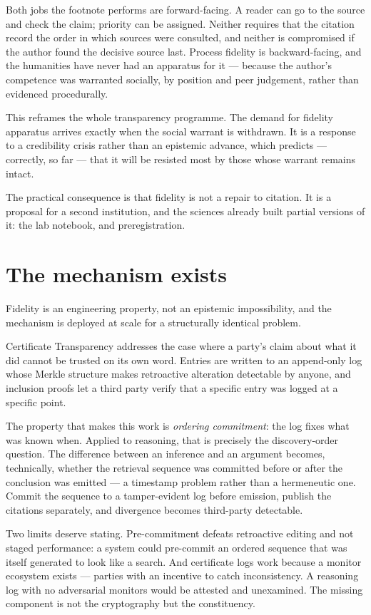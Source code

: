 \documentclass[11pt,a4paper]{article}
\begin{document}
Both jobs the footnote performs are forward-facing. A reader can go to the source and check the claim; priority can be assigned. Neither requires that the citation record the order in which sources were consulted, and neither is compromised if the author found the decisive source last. Process fidelity is backward-facing, and the humanities have never had an apparatus for it --- because the author's competence was warranted socially, by position and peer judgement, rather than evidenced procedurally.

This reframes the whole transparency programme. The demand for fidelity apparatus arrives exactly when the social warrant is withdrawn. It is a response to a credibility crisis rather than an epistemic advance, which predicts --- correctly, so far --- that it will be resisted most by those whose warrant remains intact.

The practical consequence is that fidelity is not a repair to citation. It is a proposal for a second institution, and the sciences already built partial versions of it: the lab notebook, and preregistration.

\section{The mechanism exists}
Fidelity is an engineering property, not an epistemic impossibility, and the mechanism is deployed at scale for a structurally identical problem.

Certificate Transparency addresses the case where a party's claim about what it did cannot be trusted on its own word. Entries are written to an append-only log whose Merkle structure makes retroactive alteration detectable by anyone, and inclusion proofs let a third party verify that a specific entry was logged at a specific point.

The property that makes this work is \emph{ordering commitment}: the log fixes what was known when. Applied to reasoning, that is precisely the discovery-order question. The difference between an inference and an argument becomes, technically, whether the retrieval sequence was committed before or after the conclusion was emitted --- a timestamp problem rather than a hermeneutic one. Commit the sequence to a tamper-evident log before emission, publish the citations separately, and divergence becomes third-party detectable.

Two limits deserve stating. Pre-commitment defeats retroactive editing and not staged performance: a system could pre-commit an ordered sequence that was itself generated to look like a search. And certificate logs work because a monitor ecosystem exists --- parties with an incentive to catch inconsistency. A reasoning log with no adversarial monitors would be attested and unexamined. The missing component is not the cryptography but the constituency.
\end{document}
